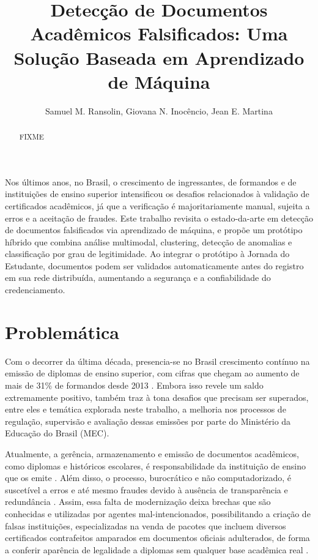 \documentclass[12pt]{article}
\title{Detecção de Documentos Acadêmicos Falsificados: Uma Solução Baseada em Aprendizado de Máquina}
\author{Samuel M. Ransolin\inst{1}, Giovana N. Inocêncio\inst{1}, Jean E. Martina\inst{1} }
\begin{document}
 

\maketitle

\begin{abstract}
  FIXME
\end{abstract}
     
\begin{resumo} 
  Nos últimos anos, no Brasil, o crescimento de ingressantes, de formandos e de instituições de ensino superior intensificou os desafios relacionados à validação de certificados acadêmicos, já que a verificação é majoritariamente manual, sujeita a erros e a aceitação de fraudes.
  Este trabalho revisita o estado-da-arte em detecção de documentos falsificados via aprendizado de máquina, e propõe um protótipo híbrido que combina análise multimodal, clustering, detecção de anomalias e classificação por grau de legitimidade.
  Ao integrar o protótipo à Jornada do Estudante, documentos podem ser validados automaticamente antes do registro em sua rede distribuída, aumentando a segurança e a confiabilidade do credenciamento.
\end{resumo}


\section{Problemática}

Com o decorrer da última década, presencia-se no Brasil crescimento contínuo na emissão de diplomas de ensino superior, com cifras que chegam ao aumento de mais de 31\% de formandos desde 2013 \cite{mec:2023}. Embora isso revele um saldo extremamente positivo, também traz à tona desafios que precisam ser superados, entre eles e temática explorada neste trabalho, a melhoria nos processos de regulação, supervisão e avaliação dessas emissões por parte do Ministério da Educação do Brasil (MEC).

Atualmente, a gerência, armazenamento e emissão de documentos acadêmicos, como diplomas e históricos escolares, é responsabilidade da instituição de ensino que os emite \cite{mec:1978}. Além disso, o processo, burocrático e não computadorizado, é suscetível a erros e até mesmo fraudes devido à ausência de transparência e redundância \cite{palma:2019}. Assim, essa falta de modernização deixa brechas que são conhecidas e utilizadas por agentes mal-intencionados, possibilitando a criação de falsas instituições, especializadas na venda de pacotes que incluem diversos certificados contrafeitos amparados em documentos oficiais adulterados, de forma a conferir aparência de legalidade a diplomas sem qualquer base acadêmica real \cite{dias:2022}.
\end{document}
